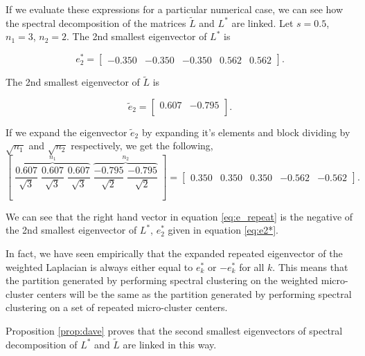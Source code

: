 If we evaluate these expressions for a particular numerical case, we can see how the spectral decomposition of the matrices $\tilde{L}$ and $L^*$ are linked.
Let $s = 0.5$, $n_1 = 3$, $n_2 = 2$. The 2nd smallest eigenvector of $L^*$ is 

\begin{equation}
  \label{eq:e2*}
   e_2^* = \left[ 
\begin{array}{ccccc}
  -0.350& -0.350& -0.350& 0.562& 0.562  
\end{array} \right].
\end{equation}

The 2nd smallest eigenvector of $\tilde{L}$ is 

\begin{equation}
  \label{eq:e2}
   \tilde{e}_2 = \left[ 
\begin{array}{cc}
  0.607 & -0.795 \\
\end{array} \right] .
\end{equation}

If we expand the eigenvector $\tilde{e}_2$ by expanding it's elements and block dividing by $\sqrt{n_1}$ and $\sqrt{n_2}$ respectively, we get the following, 
\begin{equation}
  \label{eq:e_repeat}
   \left[ \; \overbrace{\frac{0.607}{\sqrt{3}} \; \frac{0.607}{\sqrt{3}} \; \frac{0.607}{\sqrt{3}}}^{n_1} \; \overbrace{\frac{-0.795}{\sqrt{2}} \; \frac{-0.795}{\sqrt{2}}}^{n_2} \; \right] 
=  \left[ 
\begin{array}{ccccc}
0.350& 0.350& 0.350 & -0.562& -0.562  
\end{array} \right] .
\end{equation}

We can see that the right hand vector in equation \eqref{eq:e_repeat} is the negative of the 2nd smallest eigenvector of $L^*$, $e_2^* $ given in equation \eqref{eq:e2*}. %


In fact, we have seen empirically that the expanded repeated eigenvector of the weighted Laplacian is always either equal to $e_k^*$ or $-e_k^*$ for all $k$. This means that the partition generated by performing spectral clustering on the weighted micro-cluster centers will be the same as the partition generated by performing spectral clustering on a set of repeated micro-cluster centers.

Proposition \ref{prop:dave} proves that the second smallest eigenvectors of spectral decomposition of $L^*$ and $\tilde{L}$ are linked in this way.

